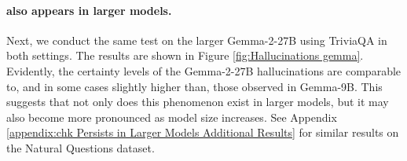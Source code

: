 \paragraph{\chk also appears in larger models.}
Next, we conduct the same test on the larger Gemma-2-27B using TriviaQA in both settings.
The results are shown in Figure \ref{fig:Hallucinations gemma}. Evidently, the certainty levels of the Gemma-2-27B hallucinations are comparable to, and in some cases slightly higher than, those observed in Gemma-9B. This suggests that not only does this phenomenon exist in larger models, but it may also become more pronounced as model size increases. See Appendix \ref{appendix:chk Persists in Larger Models Additional Results} for similar results on the Natural Questions dataset.



